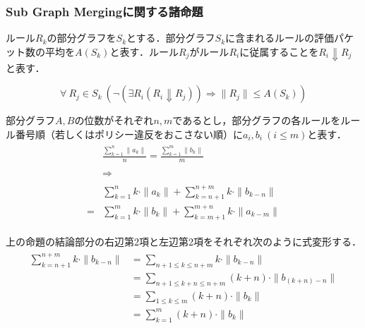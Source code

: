 \documentclass[10pt,twocolumn]{jarticle}
\begin{document}
\subsubsection{Sub Graph Mergingに関する諸命題}

ルール$R_{k}$の部分グラフを$S_{k}$とする．部分グラフ$S_{k}$に含まれるルールの評価パケット数の平均を$A(S_{k})$と表す．ルール$R_{j}$がルール$R_{i}$に従属することを$R_{i} \Downarrow R_{j}$と表す．

\begin{equation}
\forall \ R_{j} \in S_{k} \ (\lnot (\exists R_{i} (R_{i} \Downarrow R_{j})) \Rightarrow \| R_{j} \| \leq A(S_{k}))
\end{equation}

部分グラフ$A,B$の位数がそれぞれ$n, m$であるとし，部分グラフの各ルールをルール番号順（若しくはポリシー違反をおこさない順）に$a_{i}, b_{i} \ (i \leq m)$と表す．
\begin{align}
 \begin{aligned}
  & \frac{\sum_{k=1}^{n}\|a_{k}\|}{n} = \frac{\sum_{k=1}^{m}\|b_{k}\|}{m} \\
  & \\
  & \Rightarrow \\
  & \\
  & \sum_{k=1}^{n}k \cdot \|a_{k}\| + \sum_{k=n+1}^{n+m}k \cdot \|b_{k-n}\| \\
= &\sum_{k=1}^{m}k \cdot \|b_{k}\| + \sum_{k=m+1}^{m+n}k \cdot \|a_{k-m}\|
 \label{nothing}
 \end{aligned}
\end{align}

上の命題の結論部分の右辺第2項と左辺第2項をそれぞれ次のように式変形する．
\begin{align}
 \begin{aligned}
  \sum_{k=n+1}^{n+m}k \cdot \|b_{k-n}\| &=
  \sum_{n+1 \leq k \leq n+m}k \cdot \|b_{k-n}\| \\
  &= \sum_{n+1 \leq k+n \leq n+m}(k+n) \cdot \|b_{(k+n)-n}\| \\
  &= \sum_{1 \leq k \leq m}(k+n) \cdot \|b_{k}\| \\
  &= \sum_{k=1}^{m}(k+n) \cdot \|b_{k}\|
 \end{aligned}
\end{align}
\end{document}
